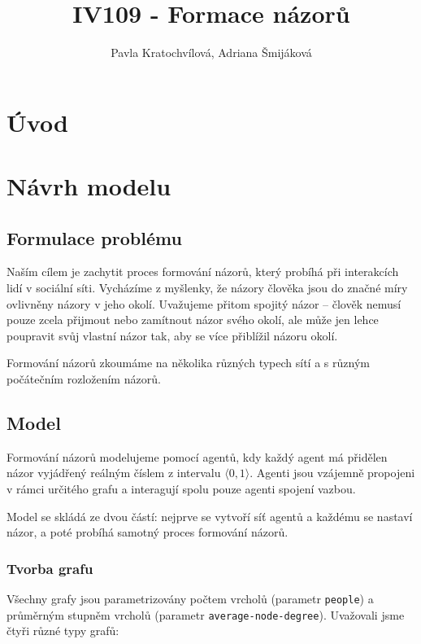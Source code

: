 \documentclass[10pt,a4paper]{report}
\author{Pavla Kratochvílová, Adriana Šmijáková}
\title{IV109 - Formace názorů}
\begin{document}
\maketitle
\chapter{Úvod}

\chapter{Návrh modelu}
\section{Formulace problému}
Naším cílem je zachytit proces formování názorů, který probíhá při interakcích lidí v sociální síti. Vycházíme z myšlenky, že názory člověka jsou do značné míry ovlivněny názory v jeho okolí. Uvažujeme přitom spojitý názor -- člověk nemusí pouze zcela přijmout nebo zamítnout názor svého okolí, ale může jen lehce poupravit svůj vlastní názor tak, aby se více přiblížil názoru okolí. 

Formování názorů zkoumáme na několika různých typech sítí a s různým počátečním rozložením názorů. 

\section{Model}
Formování názorů modelujeme pomocí agentů, kdy každý agent má přidělen názor vyjádřený reálným číslem z intervalu $\langle 0, 1 \rangle$. Agenti jsou vzájemně propojeni v rámci určitého grafu a interagují spolu pouze agenti spojení vazbou.

Model se skládá ze dvou částí: nejprve se vytvoří síť agentů a každému se nastaví názor, a poté probíhá samotný proces formování názorů.

\subsection{Tvorba grafu}
Všechny grafy jsou parametrizovány počtem vrcholů (parametr \texttt{people}) a průměrným stupněm vrcholů (parametr \texttt{average-node-degree}). Uvažovali jsme čtyři různé typy grafů:
\end{document}
